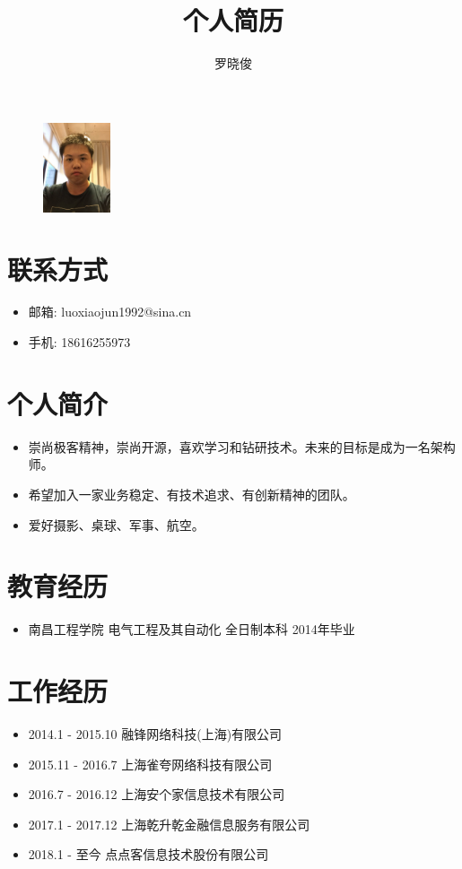 \documentclass[a4paper,12pt]{article}
\title{个人简历}
\author{罗晓俊}
\begin{document}
	\begin{CJK}{UTF8}{gbsn}

		\maketitle{}

		\begin{figure}[h]
			\centering\includegraphics[height=100px]{webwxgetmsgimg.jpeg}
		\end{figure}

		\section{联系方式}
			\begin{itemize}
				\item{邮箱: luoxiaojun1992@sina.cn}
				\item{手机: 18616255973}
			\end{itemize}

		\section{个人简介}
			\begin{itemize}
				\item{崇尚极客精神，崇尚开源，喜欢学习和钻研技术。未来的目标是成为一名架构师。}
				\item{希望加入一家业务稳定、有技术追求、有创新精神的团队。}
				\item{爱好摄影、桌球、军事、航空。}
			\end{itemize}
		
		\section{教育经历}
			\begin{itemize}
				\item{南昌工程学院 电气工程及其自动化 全日制本科 2014年毕业}
			\end{itemize}
		
		\section{工作经历}
			\begin{itemize}
				\item{2014.1 - 2015.10 融锋网络科技(上海)有限公司}
				\item{2015.11 - 2016.7 上海雀夸网络科技有限公司}
				\item{2016.7 - 2016.12 上海安个家信息技术有限公司}
				\item{2017.1 - 2017.12 上海乾升乾金融信息服务有限公司}
				\item{2018.1 - 至今 点点客信息技术股份有限公司}
			\end{itemize}
		

\end{CJK}
\end{document}
